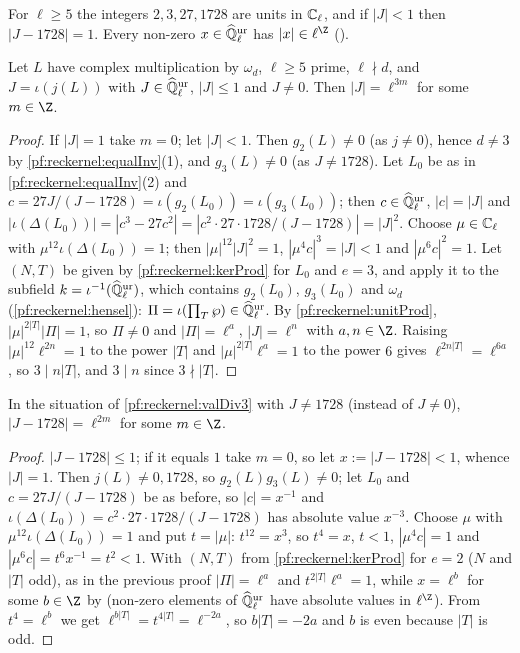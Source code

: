 For $\ell\ge5$ the integers $2,3,27,1728$ are units in $\mathbb{C}_\ell$, and if $|J|<1$ then $|J-1728|=1$. Every
non-zero $x\in\widehat{\mathbb{Q}}{}_\ell^{\mathrm{ur}}$ has $|x|\in\ell^{\Z}$ ().

\begin{lemma}[Valuation of $j$]\label{pf:reckernel:valDiv3}
Let $L$ have complex multiplication by $\omega_d$, $\ell\ge5$ prime, $\ell\nmid d$, and $J=\iota(j(L))$ with
$J\in\widehat{\mathbb{Q}}{}_\ell^{\mathrm{ur}}$, $|J|\le1$ and $J\ne0$. Then $|J|=\ell^{3m}$ for some $m\in\Z$.
\end{lemma}

\begin{proof}
If $|J|=1$ take $m=0$; let $|J|<1$. Then $g_2(L)\ne0$ (as $j\ne0$), hence $d\ne3$ by
\cref{pf:reckernel:equalInv}(1), and $g_3(L)\ne0$ (as $J\ne1728$). Let $L_0$ be as in \cref{pf:reckernel:equalInv}(2)
and $c=27J/(J-1728)=\iota(g_2(L_0))=\iota(g_3(L_0))$; then $c\in\widehat{\mathbb{Q}}{}_\ell^{\mathrm{ur}}$, $|c|=|J|$ and
$|\iota(\Delta(L_0))|=|c^3-27c^2|=|c^2\cdot27\cdot1728/(J-1728)|=|J|^2$. Choose $\mu\in\mathbb{C}_\ell$ with
$\mu^{12}\iota(\Delta(L_0))=1$; then $|\mu|^{12}|J|^2=1$, $|\mu^4c|^3=|J|<1$ and $|\mu^6c|^2=1$. Let $(N,T)$ be given
by \cref{pf:reckernel:kerProd} for $L_0$ and $e=3$, and apply it to the subfield
$k=\iota^{-1}(\widehat{\mathbb{Q}}{}_\ell^{\mathrm{ur}})$, which contains $g_2(L_0)$, $g_3(L_0)$ and $\omega_d$ (\cref{pf:reckernel:hensel}):
$\Pi=\iota(\prod_T\wp)\in\widehat{\mathbb{Q}}{}_\ell^{\mathrm{ur}}$. By \cref{pf:reckernel:unitProd}, $|\mu|^{2|T|}|\Pi|=1$, so $\Pi\ne0$ and
$|\Pi|=\ell^a$, $|J|=\ell^n$ with $a,n\in\Z$. Raising $|\mu|^{12}\ell^{2n}=1$ to the power $|T|$ and
$|\mu|^{2|T|}\ell^a=1$ to the power $6$ gives $\ell^{2n|T|}=\ell^{6a}$, so $3\mid n|T|$, and $3\mid n$ since
$3\nmid|T|$.
\end{proof}

\begin{lemma}[Valuation of $j-1728$]\label{pf:reckernel:valDiv2}
In the situation of \cref{pf:reckernel:valDiv3} with $J\ne1728$ (instead of $J\ne0$), $|J-1728|=\ell^{2m}$ for some
$m\in\Z$.
\end{lemma}

\begin{proof}
$|J-1728|\le1$; if it equals $1$ take $m=0$, so let $x:=|J-1728|<1$, whence $|J|=1$. Then $j(L)\ne0,1728$, so
$g_2(L)g_3(L)\ne0$; let $L_0$ and $c=27J/(J-1728)$ be as before, so $|c|=x^{-1}$ and
$\iota(\Delta(L_0))=c^2\cdot27\cdot1728/(J-1728)$ has absolute value $x^{-3}$. Choose $\mu$ with
$\mu^{12}\iota(\Delta(L_0))=1$ and put $t=|\mu|$: $t^{12}=x^3$, so $t^4=x$, $t<1$, $|\mu^4c|=1$ and
$|\mu^6c|=t^6x^{-1}=t^2<1$. With $(N,T)$ from \cref{pf:reckernel:kerProd} for $e=2$ ($N$ and $|T|$ odd), as in the
previous proof $|\Pi|=\ell^a$ and $t^{2|T|}\ell^a=1$, while $x=\ell^b$ for some $b\in\Z$ by
 (non-zero elements of $\widehat{\mathbb{Q}}{}_\ell^{\mathrm{ur}}$ have absolute values in
$\ell^{\Z}$). From $t^4=\ell^b$ we get $\ell^{b|T|}=t^{4|T|}=\ell^{-2a}$,
so $b|T|=-2a$ and $b$ is even because $|T|$ is odd.
\end{proof}

